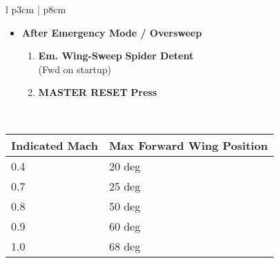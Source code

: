 \documentclass[8pt,usenames,dvipsnames,twoside]{article}
\begin{document}
\begin{center}
\begin{longtable}{l p{3cm} | p{8cm}}
\begin{minipage}[t]{\linewidth}
\begin{itemize}
					\item \textbf{After Emergency Mode / Oversweep}
					\begin{enumerate}
						\item \textbf{Em. Wing-Sweep} \dotfill \textbf{Spider Detent} \\
						\hfill (Fwd on startup)
						\item \textbf{MASTER RESET} \dotfill \textbf{Press}
					\end{enumerate}
				\end{itemize}
			\end{minipage} \\
			\bottomrule
		\end{longtable}
	\end{center}
	\begin{center}
		\begin{tabular}{p{3cm} | p{5cm}}
			\toprule
			\textbf{Indicated Mach} & \textbf{Max Forward Wing Position} \\
			\midrule
			0.4 & 20 deg \\
			\midrule
			0.7 & 25 deg \\
			\midrule
			0.8 & 50 deg \\
			\midrule
			0.9 & 60 deg \\
			\midrule
			1.0 & 68 deg \\
			\bottomrule
		\end{tabular}
	\end{center}

	\clearpage
\end{document}
